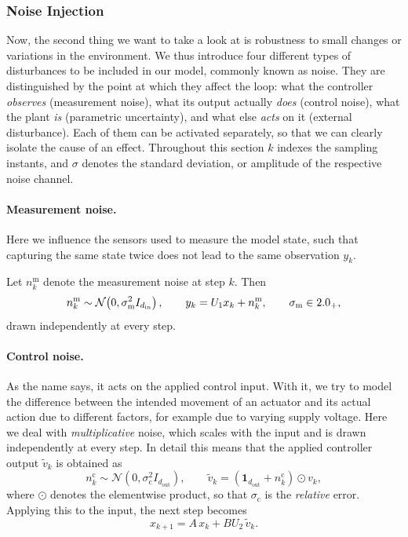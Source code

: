 \subsubsection{Noise Injection}
\label{subsubsec:noise-injection}

Now, the second thing we want to take a look at is robustness to
small changes or variations in the environment.
We thus introduce four different types of disturbances to be included in our model,
commonly known as noise. They are distinguished by the point at which they
affect the loop: what the controller \emph{observes} (measurement noise),
what its output actually \emph{does} (control noise), what the plant
\emph{is} (parametric uncertainty), and what else \emph{acts} on it
(external disturbance). Each of them can be activated separately, so that we
can clearly isolate the cause of an effect. Throughout this section
$k$ indexes the sampling instants, and $\sigma$ denotes the standard deviation,
or amplitude of the respective noise channel.

\paragraph{Measurement noise.}
Here we influence the sensors used to measure
the model state, such that capturing the same state twice does
not lead to the same observation $y_k$.

Let $n^{\mathrm{m}}_k$ denote the measurement noise at step $k$. Then
\begin{equation}
    \label{eq:measurement-noise}
    n^{\mathrm{m}}_k \sim \mathcal{N}\!\left(0, \sigma_{\mathrm{m}}^{2} I_{d_{\mathrm{in}}}\right),
    \qquad
    y_k = U_1 x_k + n^{\mathrm{m}}_k ,
    \qquad \sigma_{\mathrm{m}} \in 2.0_{+} ,
\end{equation}
drawn independently at every step.

\paragraph{Control noise.}
As the name says, it acts on the applied control input. With it,
we try to model the difference between the intended movement of an actuator
and its actual action due to different factors, for example due to varying supply voltage.
Here we deal with \emph{multiplicative} noise, which scales with the input and is drawn
independently at every step. In detail this means that the applied controller
output $\tilde{v}_k$ is obtained as
\begin{equation}
    \label{eq:control-noise}
    n^{\mathrm{c}}_k \sim \mathcal{N}\!\left(0, \sigma_{\mathrm{c}}^{2} I_{d_{\mathrm{out}}}\right),
    \qquad
    \tilde{v}_k = \left( \mathbf{1}_{d_{\mathrm{out}}} + n^{\mathrm{c}}_k \right) \odot v_k ,
\end{equation}
where $\odot$ denotes the elementwise product, so that $\sigma_{\mathrm{c}}$ is
the \emph{relative} error. Applying this to the input, the next step becomes
\begin{equation}
    \label{eq:control-noise-step}
    x_{k+1} = A\, x_k + B U_2\, \tilde{v}_k .
\end{equation}

